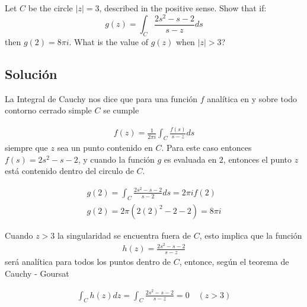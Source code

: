 \begin{problem}{2}
    Let $C$ be the circle $|z| = 3$, described in the positive sense. Show that if:
    \begin{equation}
        g(z) = \int_C \frac{2s^2 - s - 2}{s-z}ds
    \end{equation} 
    then $g(2) = 8\pi i$. What is the value of $g(z)$ when $|z| > 3$?   
\end{problem}
\subsection*{Solución}
La Integral de Cauchy nos dice que para una función $f$ analítica en y sobre todo contorno cerrado simple $C$ se cumple 

\begin{gather}
    f(z) = \frac{1}{2\pi i}\int_C \frac{f(s)}{s - z}ds
\end{gather}
siempre que $z$ sea un punto contenido en $C$. Para este caso entonces $f(s) = 2s^2 - s -2$, y cuando la función $g$ es evaluada en $2$, entonces el punto $z$ está contenido dentro del circulo de $C$. 

\begin{result}
    \begin{gather}
        g(2) = \int_C \frac{2s^2 - s - 2}{s-2}ds = 2\pi i f(2)\\
        g(2) = 2\pi (2(2)^2 - 2 - 2) = 8\pi i
    \end{gather}
\end{result}
Cuando $z > 3$ la singularidad se encuentra fuera de $C$, esto implica que la función
\begin{gather*}
    h(z) = \frac{2s^2 - s - 2}{s-z}
\end{gather*}
será analítica para todos los puntos dentro de $C$, entonce, según el teorema de Cauchy - Goursat

\begin{result}
    \begin{gather}
        \int_C h(z)dz = \int_C \frac{2s^2 - s - 2}{s-z} = 0 \quad (z > 3)
    \end{gather}
\end{result}
